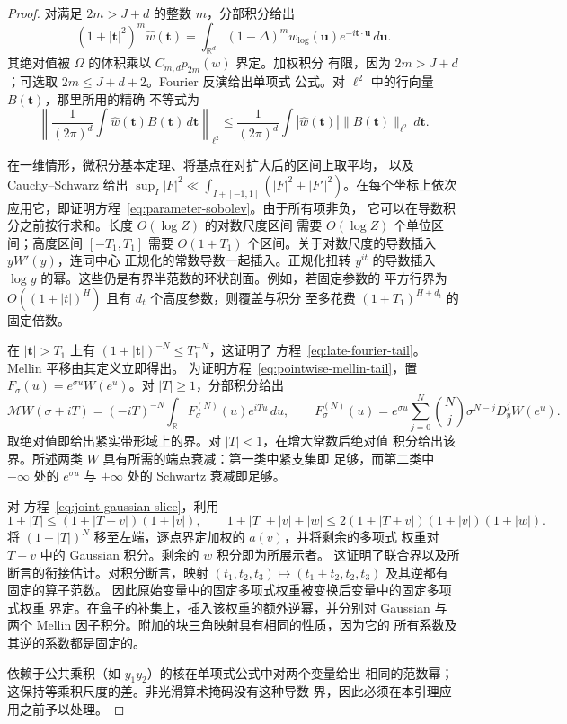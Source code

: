 \begin{proof}
对满足 $2m>J+d$ 的整数 $m$，分部积分给出
\[
 (1+|\boldsymbol t|^2)^m\widehat w(\boldsymbol t)
 =\int_{\mathbb R^d}(1-\Delta)^m w_{\log}(\boldsymbol u)
                       e^{-i\boldsymbol t\cdot\boldsymbol u}\,d\boldsymbol u.
\]
其绝对值被 $\Omega$ 的体积乘以 $C_{m,d}p_{2m}(w)$ 界定。加权积分
有限，因为 $2m>J+d$；可选取 $2m\le J+d+2$。Fourier 反演给出单项式
公式。对 $\ell^2$ 中的行向量 $B(\boldsymbol t)$，那里所用的精确
不等式为
\[
 \left\|\frac1{(2\pi)^d}\int\widehat w(\boldsymbol t)
                 B(\boldsymbol t)\,d\boldsymbol t\right\|_{\ell^2}
 \le\frac1{(2\pi)^d}\int|\widehat w(\boldsymbol t)|
                 \|B(\boldsymbol t)\|_{\ell^2}\,d\boldsymbol t.
\]

在一维情形，微积分基本定理、将基点在对扩大后的区间上取平均，
以及 Cauchy--Schwarz 给出
$\sup_I|F|^2\ll\int_{I+[-1,1]}(|F|^2+|F'|^2)$。在每个坐标上依次
应用它，即证明方程~\eqref{eq:parameter-sobolev}。由于所有项非负，
它可以在导数积分之前按行求和。长度 $O(\log Z)$ 的对数尺度区间
需要 $O(\log Z)$ 个单位区间；高度区间 $[-T_1,T_1]$ 需要
$O(1+T_1)$ 个区间。关于对数尺度的导数插入 $yW'(y)$，连同中心
正规化的常数导数一起插入。正规化扭转 $y^{it}$ 的导数插入
$\log y$ 的幂。这些仍是有界半范数的环状剖面。例如，若固定参数的
平方行界为 $O((1+|t|)^H)$ 且有 $d_t$ 个高度参数，则覆盖与积分
至多花费 $(1+T_1)^{H+d_t}$ 的固定倍数。

在 $|\boldsymbol t|>T_1$ 上有
$(1+|\boldsymbol t|)^{-N}\le T_1^{-N}$，这证明了
方程~\eqref{eq:late-fourier-tail}。Mellin 平移由其定义立即得出。
为证明方程~\eqref{eq:pointwise-mellin-tail}，置
$F_\sigma(u)=e^{\sigma u}W(e^u)$。对 $|T|\ge1$，分部积分给出
\[
 \mathcal MW(\sigma+iT)=(-iT)^{-N}
              \int_{\mathbb R}F_\sigma^{(N)}(u)e^{iTu}\,du,
 \qquad
 F_\sigma^{(N)}(u)=e^{\sigma u}\sum_{j=0}^N
       \binom Nj\sigma^{N-j}D_y^jW(e^u).
\]
取绝对值即给出紧实带形域上的界。对 $|T|<1$，在增大常数后绝对值
积分给出该界。所述两类 $W$ 具有所需的端点衰减：第一类中紧支集即
足够，而第二类中 $-\infty$ 处的 $e^{\sigma u}$ 与 $+\infty$ 处的
Schwartz 衰减即足够。

对 方程~\eqref{eq:joint-gaussian-slice}，利用
\[
 1+|T|\le(1+|T+v|)(1+|v|),\qquad
 1+|T|+|v|+|w|\le2(1+|T+v|)(1+|v|)(1+|w|).
\]
将 $(1+|T|)^N$ 移至左端，逐点界定加权的 $a(v)$，并将剩余的多项式
权重对 $T+v$ 中的 Gaussian 积分。剩余的 $w$ 积分即为所展示者。
这证明了联合界以及所断言的衔接估计。对积分断言，映射
$(t_1,t_2,t_3)\mapsto(t_1+t_2,t_2,t_3)$ 及其逆都有固定的算子范数。
因此原始变量中的固定多项式权重被变换后变量中的固定多项式权重
界定。在盒子的补集上，插入该权重的额外逆幂，并分别对 Gaussian 与
两个 Mellin 因子积分。附加的块三角映射具有相同的性质，因为它的
所有系数及其逆的系数都是固定的。

依赖于公共乘积（如 $y_1y_2$）的核在单项式公式中对两个变量给出
相同的范数幂；这保持等乘积尺度的差。非光滑算术掩码没有这种导数
界，因此必须在本引理应用之前予以处理。
\end{proof}

